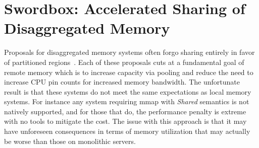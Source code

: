 \documentclass[12pt]{ucsddissertation}
\begin{document}








\chapter{Swordbox: Accelerated Sharing of Disaggregated Memory}
\label{chap:swordbox}

Proposals for disaggregated memory systems often forgo sharing entirely in favor of partitioned
regions~\cite{infiniswap,fastswap,leap,legoos,blade}. Each of these proposals cuts at a fundamental
goal of remote memory which is to increase capacity via pooling and reduce the need to increase CPU
pin counts for increased memory bandwidth. The unfortunate result is that these systems do not meet
the same expectations as local memory systems. For instance any system requiring mmap with
\textit{Shared} semantics is not natively supported, and for those that do, the performance penalty
is extreme with no tools to mitigate the cost. The issue with this approach is that it may have
unforeseen consequences in terms of memory utilization that may actually be worse than those on
monolithic servers. 
\end{document}
